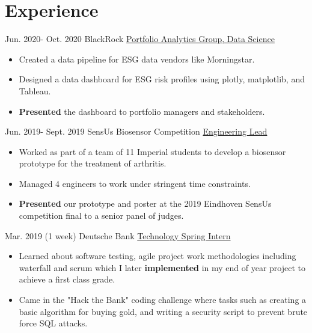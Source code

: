 \documentclass[letterpaper]{twentysecondcv} %
\begin{document}
\section{Experience}
\begin{twenty}
    \twentyitem
        {Jun. 2020-}
        {Oct. 2020}
        {BlackRock}
        {\href{http://www.blackrock.com}{Portfolio Analytics Group, Data Science}}
        {}
        {\begin{itemize}
            \item Created a data pipeline for ESG data vendors like Morningstar. 
            \item Designed a data dashboard for ESG risk profiles using plotly, matplotlib, and Tableau.
            \item \textbf{Presented} the dashboard to portfolio managers and stakeholders. 
        \end{itemize}
        }
    \end{twenty}
    
\begin{twenty}
    \twentyitem
        {Jun. 2019-}
        {Sept. 2019}
        {SensUs Biosensor Competition}
        {\href{http://www.sensus.org}{Engineering Lead}}
        {}
        {\begin{itemize}
            \item Worked as part of a team of 11 Imperial students to develop a biosensor prototype for the treatment of arthritis. 
            \item Managed 4 engineers to work under stringent time constraints.
            \item \textbf{Presented} our prototype and poster at the 2019 Eindhoven SensUs competition final to a senior panel of judges. \vspace{1mm}
        \end{itemize}
        }
    \end{twenty}
    
\begin{twenty}

	\twentyitem
    	{Mar. 2019}
		{(1 week)}
        {Deutsche Bank}
        {\href{http://www.db.com}{Technology Spring Intern}}
        {}
        {
        {\begin{itemize} 
        \item Learned about software testing, agile project work methodologies including waterfall and scrum which I later \textbf{implemented} in my end of year project to achieve a first class grade. 
        \item Came  in the "Hack the Bank" coding challenge where tasks such as creating a basic algorithm for buying gold, and writing a security script to prevent brute force SQL attacks. \vspace{1mm}
		\end{itemize}}
        }
\end{twenty}
\end{document}
